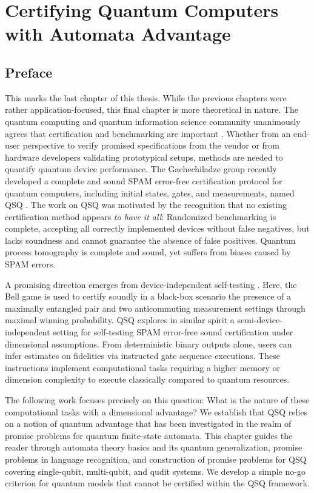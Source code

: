 \documentclass[../main.tex]{subfiles}
\begin{document}
\chapter{Certifying Quantum Computers with Automata Advantage}\label{chap:automaton}

\section{Preface}
This marks the last chapter of this thesis. While the previous chapters were rather application-focused, this final chapter is more theoretical in nature. The quantum computing and quantum information science community unanimously agrees that certification and benchmarking are important \cite{eisert2020quantum}. Whether from an end-user perspective to verify promised specifications from the vendor or from hardware developers validating prototypical setups, methods are needed to quantify quantum device performance. The Gachechiladze group recently developed a complete and sound \ac{SPAM} error-free certification protocol for quantum computers, including initial states, gates, and measurements, named \ac{QSQ} \cite{noller2024self, noller2024classical}. The work on \ac{QSQ} was motivated by the recognition that no existing certification method appears \textit{to have it all}: Randomized benchmarking \cite{knill2008randomized} is complete, accepting all correctly implemented devices without false negatives, but lacks soundness and cannot guarantee the absence of false positives. Quantum process tomography \cite{o2004quantum} is complete and sound, yet suffers from biases caused by \ac{SPAM} errors.

A promising direction emerges from device-independent self-testing \cite{vsupic2020self}. Here, the Bell game \cite{bell1964einstein, brunner2014bell} is used to certify soundly in a black-box scenario the presence of a maximally entangled pair and two anticommuting measurement settings through maximal winning probability. \ac{QSQ} explores in similar spirit a semi-device-independent setting for self-testing \ac{SPAM} error-free sound certification under dimensional assumptions. From deterministic binary outputs alone, users can infer estimates on fidelities via instructed gate sequence executions. These instructions implement computational tasks requiring a higher memory or dimension complexity to execute classically compared to quantum resources.

The following work focuses precisely on this question: What is the nature of these computational tasks with a dimensional advantage? We establish that \ac{QSQ} relies on a notion of quantum advantage that has been investigated in the realm of promise problems for quantum finite-state automata. This chapter guides the reader through automata theory basics and its quantum generalization, promise problems in language recognition, and construction of promise problems for \ac{QSQ} covering single-qubit, multi-qubit, and qudit systems. We develop a simple no-go criterion for quantum models that cannot be certified within the \ac{QSQ} framework.
\end{document}
